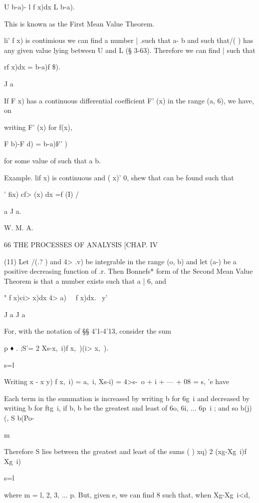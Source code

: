 U b-a)- l f x)dx L b-a).

This is known as the First Mean Value Theorem.

li' f x) is contimious we can find a number | .such that a- b and such
that/( ) has any given value lying between U and L (§ 3-63). Therefore
we can find | such that



rf x)dx = b-a)f \$).

J a



If F x) has a continuous differential coefficient F' (x) in the range
(a, 6), we have, on

writing F' (x) for f(x),

F b)-F d) = b-a)F' )

for some value of such that a b.

Example. lif x) is continuous and ( x)' 0, shew that can be found such
that



' fix) cf> (x) dx =f (I) / %

a J a.



W. M. A.



66 THE PROCESSES OF ANALYSIS [CHAP. IV

(11) Let /(.? ) and 4> .v) be integrable in the range (o, b) and let
(a-) be a positive decreasing function of .r. Then Bonnefs* form of
the Second Mean Value Theorem is that a number exists such that a | 6,
and

 " f x)ci> x)dx 4> a) \ \ f x)dx. \ y'

J a J a

For, with the notation of §§ 4'1-4'13, consider the sum

p ♦ . ;S'= 2 Xs-x,\ i)f x,\ )(i> x,\ ).

s=l

Writing x - x y) f x,\ i) = a,\ i, Xs-i) = 4>s-\, o + i + --- + 08 =
s, 'e have

Each term in the summation is increased by writing b for 6g\ i and
decreased by writing b for ftg\ i, if b, b be the greatest and least
of 6o, 6i, ... 6p\ i ; and so b(j)(, S b(Po-

m

Therefore S lies between the greatest and least of the sums ( ) xq) 2
(xg-Xg\ i)f Xg\ i)

s=l

where m = l, 2, 3, ... p. But, given e, we can find 8 such that, when
Xg-Xg\ i<d,

